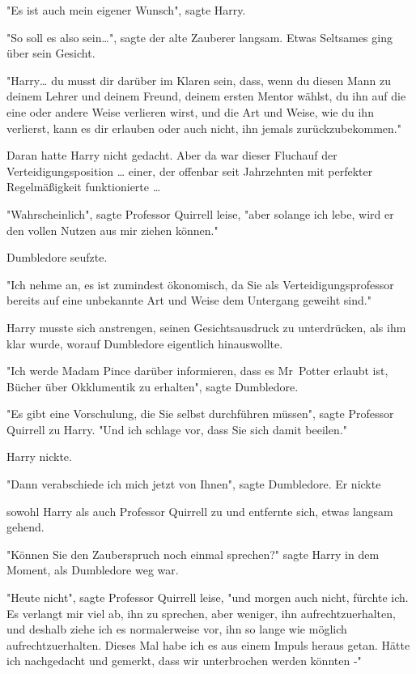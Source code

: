 {"Es ist auch mein eigener Wunsch", sagte Harry.

"So soll es also sein…", sagte der alte Zauberer langsam. Etwas Seltsames ging über sein Gesicht.

"Harry… du musst dir darüber im Klaren sein, dass, wenn du diesen Mann zu deinem Lehrer und deinem Freund, deinem ersten Mentor wählst, du ihn auf die eine oder andere Weise verlieren wirst, und die Art und Weise, wie du ihn verlierst, kann es dir erlauben oder auch nicht, ihn jemals zurückzubekommen."

Daran hatte Harry nicht gedacht. Aber da war dieser Fluchauf der Verteidigungsposition … einer, der offenbar seit Jahrzehnten mit perfekter Regelmäßigkeit funktionierte …

"Wahrscheinlich", sagte Professor Quirrell leise, "aber solange ich lebe, wird er den vollen Nutzen aus mir ziehen können."

Dumbledore seufzte.

"Ich nehme an, es ist zumindest ökonomisch, da Sie als Verteidigungsprofessor bereits auf eine unbekannte Art und Weise dem Untergang geweiht sind."

Harry musste sich anstrengen, seinen Gesichtsausdruck zu unterdrücken, als ihm klar wurde, worauf Dumbledore eigentlich hinauswollte.

"Ich werde Madam Pince darüber informieren, dass es Mr~Potter erlaubt ist, Bücher über Okklumentik zu erhalten", sagte Dumbledore.

"Es gibt eine Vorschulung, die Sie selbst durchführen müssen", sagte Professor Quirrell zu Harry. "Und ich schlage vor, dass Sie sich damit beeilen."

Harry nickte.

"Dann verabschiede ich mich jetzt von Ihnen", sagte Dumbledore. Er nickte

sowohl Harry als auch Professor Quirrell zu und entfernte sich, etwas langsam gehend.

"Können Sie den Zauberspruch noch einmal sprechen?" sagte Harry in dem Moment, als Dumbledore weg war.

"Heute nicht", sagte Professor Quirrell leise, "und morgen auch nicht, fürchte ich. Es verlangt mir viel ab, ihn zu sprechen, aber weniger, ihn aufrechtzuerhalten, und deshalb ziehe ich es normalerweise vor, ihn so lange wie möglich aufrechtzuerhalten. Dieses Mal habe ich es aus einem Impuls heraus getan. Hätte ich nachgedacht und gemerkt, dass wir unterbrochen werden könnten -"

}
